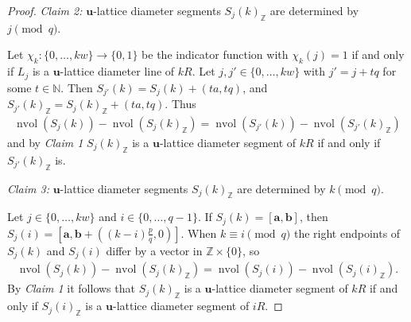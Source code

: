 \documentclass[11pt]{article}
\newcommand{\ba}{\mathbf{a}}
\newcommand{\bb}{\mathbf{b}}
\newcommand{\bu}{\mathbf{u}}
\newcommand{\Z}{\mathbb{Z}}
\newcommand{\N}{\mathbb{N}}
\DeclareMathOperator{\nvol}{nvol}
\begin{document}
\begin{proof}
    \textit{Claim 2:} $\bu$-lattice diameter segments $S_j(k)_{\Z}$ are determined by $j \pmod q$. 
    
    Let $\chi_k: \{0, \ldots, kw\} \to \{0,1\}$ be the indicator function with $\chi_k(j)=1$ if and only if $L_j$ is a $\bu$-lattice diameter line of $kR$. Let $j,j' \in \{0, \ldots, kw\}$ with $j'= j+tq$ for some $t \in \N$. Then $S_{j'}(k) =S_j(k)+(ta,tq)$, and $S_{j'}(k)_\Z =S_j(k)_{\Z}+(ta,tq)$. Thus
    \begin{align*}
         \nvol(S_j(k))-\nvol(S_{j}(k)_{\Z})=\nvol(S_{j'}(k))-\nvol(S_{j'}(k)_{\Z})
    \end{align*}
    and by \textit{Claim 1} $S_j(k)_\Z$ is a $\bu$-lattice diameter segment of $kR$ if and only if $S_{j'}(k)_\Z$ is.
    
    \textit{Claim 3:} $\bu$-lattice diameter segments $S_j(k)_\Z$ are determined by $k \pmod q$.
    
    Let $j \in \{0, \ldots, kw\}$ and $i \in \{0, \ldots, q-1\}$. If $S_j(k) = [\ba,\bb]$, then $S_j(i) = [\ba,\bb + ((k-i)\frac{p}{q},0)]$. When $k \equiv i \pmod q$ the right endpoints of $S_j(k)$ and $S_j(i)$ differ by a vector in $\Z \times \{0\}$, so
    \begin{align*}
         \nvol(S_j(k))-\nvol(S_j(k)_\Z)=\nvol(S_j(i))-\nvol(S_j(i)_\Z).
    \end{align*}
    By \textit{Claim 1} it follows that $S_j(k)_\Z$ is a $\bu$-lattice diameter segment of $kR$ if and only if $S_j(i)_\Z$ is a $\bu$-lattice diameter segment of $iR$.
    

\end{proof}
\end{document}
